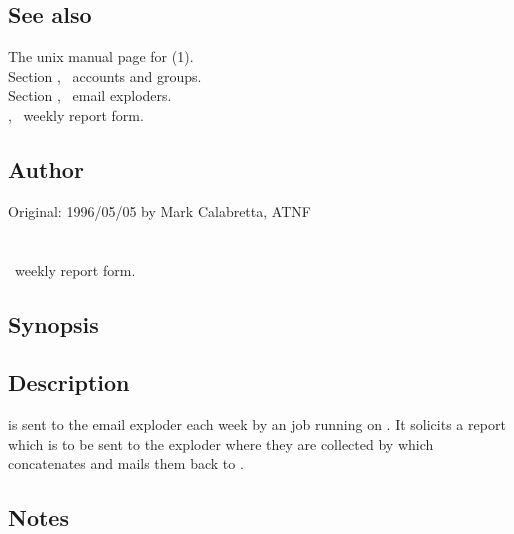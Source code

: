 \subsection*{See also}

The unix manual page for (1).\\
Section , \aipspp\ accounts and groups.\\
Section , \aipspp\ email exploders.\\
, \aipspp\ weekly report form.

\subsection*{Author}
 
Original: 1996/05/05 by Mark Calabretta, ATNF


\newpage
\section{}
\label{report_form}

\aipspp\ weekly report form.

\subsection*{Synopsis}
 
\begin{synopsis}
\end{synopsis}
 
\subsection*{Description}

 is sent to the \mbox{} email
exploder each week by an   job running on
.  It solicits a report which is to be sent to the
\mbox{} exploder where they are collected by 
which concatenates and mails them back to \mbox{}.

\subsection*{Notes}
 
